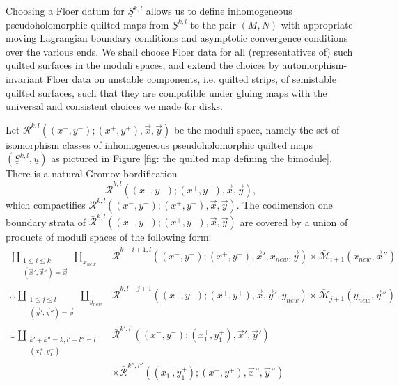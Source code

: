 \documentclass{amsart}
\numberwithin{equation}{section}
\numberwithin{figure}{section}
\begin{document}
	Choosing a Floer datum for $\underline{S}^{k, l}$ allows us to define inhomogeneous pseudoholomorphic quilted maps from $\underline{S}^{k, l}$ to the pair $(M, N)$ with appropriate moving Lagrangian boundary conditions and asymptotic convergence conditions over the various ends. We shall choose Floer data for all (representatives of) such quilted surfaces in the moduli spaces, and extend the choices by automorphism-invariant Floer data on unstable components, i.e. quilted strips, of semistable quilted surfaces, such that they are compatible under gluing maps with the universal and consistent choices we made for disks. \par
	Let $\mathcal{R}^{k, l}((x^{-}, y^{-}); (x^{+}, y^{+}), \vec{x}, \vec{y})$ be the moduli space, namely the set of isomorphism classes of inhomogeneous pseudoholomorphic quilted maps $(\underline{S}^{k, l}, \underline{u})$ as pictured in Figure \ref{fig: the quilted map defining the bimodule}. There is a natural Gromov bordification
\begin{equation}\label{moduli space for defining the bimodule structure maps}
\bar{\mathcal{R}}^{k, l}((x^{-}, y^{-}); (x^{+}, y^{+}), \vec{x}, \vec{y}),
\end{equation}
which compactifies $\mathcal{R}^{k, l}((x^{-}, y^{-}); (x^{+}, y^{+}), \vec{x}, \vec{y})$. The codimension one boundary strata of $\bar{\mathcal{R}}^{k, l}((x^{-}, y^{-}); (x^{+}, y^{+}), \vec{x}, \vec{y})$ are covered by a union of products of moduli spaces of the following form:
\begin{equation} \label{boundary stratum of the moduli space defining the bimodule structure}
\begin{split}
\coprod_{\substack{1 \le i \le k\\ (\vec{x}', \vec{x}'') = \vec{x}}} \coprod_{x_{new}} 
&\bar{\mathcal{R}}^{k-i+1, l}((x^{-}, y^{-}); (x^{+}, y^{+}), \vec{x}', x_{new}, \vec{y}) \times \bar{\mathcal{M}}_{i+1}(x_{new}, \vec{x}'')\\
\cup \coprod_{\substack{1 \le j \le l\\ (\vec{y}', \vec{y}'') = \vec{y}}} \coprod_{y_{new}} 
&\bar{\mathcal{R}}^{k, l-j+1}((x^{-}, y^{-}); (x^{+}, y^{+}), \vec{x}, \vec{y}', y_{new}) \times \bar{\mathcal{M}}_{j+1}(y_{new}, \vec{y}'')\\
\cup \coprod_{\substack{k'+k''=k, l'+l''=l\\ (x^{+}_{1}, y^{+}_{1})}}
&\bar{\mathcal{R}}^{k', l'}((x^{-}, y^{-}); (x^{+}_{1}, y^{+}_{1}), \vec{x}', \vec{y}')\\
&\times \bar{\mathcal{R}}^{k'', l''}((x^{+}_{1}, y^{+}_{1}); (x^{+}, y^{+}), \vec{x}'', \vec{y}'')
\end{split}
\end{equation}
\end{document}
